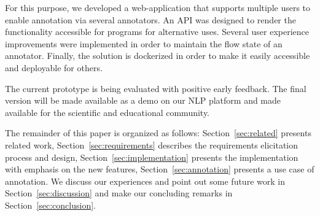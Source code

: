 For this purpose, we developed a web-application that supports multiple users to enable annotation via several annotators.
An API was designed to render the functionality accessible for programs for alternative uses.
Several user experience improvements were implemented in order to maintain the flow state of an annotator.
Finally, the solution is dockerized in order to make it easily accessible and deployable for others. 

The current prototype is being evaluated with positive early feedback. 
The final version will be made available as a demo on our NLP platform and made available for the scientific and educational community. 

The remainder of this paper is organized as follows: 
Section~\ref{sec:related} presents related work, 
Section~\ref{sec:requirements} describes the requirements elicitation process and design, 
Section~\ref{sec:implementation} presents the implementation with emphasis on the new features, 
Section~\ref{sec:annotation} presents a use case of annotation.
We discuss our experiences and point out some future work in Section~\ref{sec:discussion} and make our concluding remarks in Section~\ref{sec:conclusion}.
